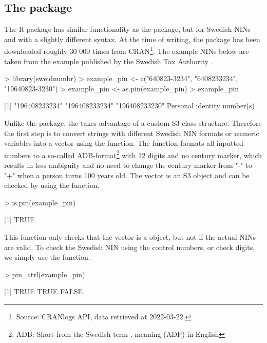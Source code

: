 \subsection{The  package}

The  R package has similar functionality as the  package, but for Swedish NINs and with a slightly different syntax. At the time of writing, the package has been downloaded roughly 30 000 times from CRAN\footnote{Source: CRANlogs API, data retrieved at 2022-03-22.}. The example NINs below are taken from the example published by the Swedish Tax Authority \citet{sv2007}.

\begin{example}
  > library(sweidnumbr)
  > example_pin <- c("640823-3234", "6408233234", "19640823-3230")
  > example_pin <- as.pin(example_pin)
  > example_pin

  [1] "196408233234" "196408233234" "196408233230"
  Personal identity number(s)
\end{example}

Unlike the  package, the  takes advantage of a custom S3 class structure. Therefore the first step is to convert strings with different Swedish NIN formats or numeric variables into a  vector using the  function. The  function formats all inputted numbers to a so-called ADB-format\footnote{ADB: Short  from the Swedish term , meaning  (ADP) in English} with 12 digits and no century marker, which results in less ambiguity and no need to change the century marker from "-" to "+" when a person turns 100 years old. The  vector is an S3 object and can be checked by using the  function.

\begin{example}
  > is.pin(example_pin)

  [1] TRUE
\end{example}

This function only checks that the vector is a  object, but not if the actual NINs are valid. To check the Swedish NIN using the control numbers, or check digits, we simply use the  function.

\begin{example}
  > pin_ctrl(example_pin)

  [1] TRUE TRUE FALSE
\end{example}

